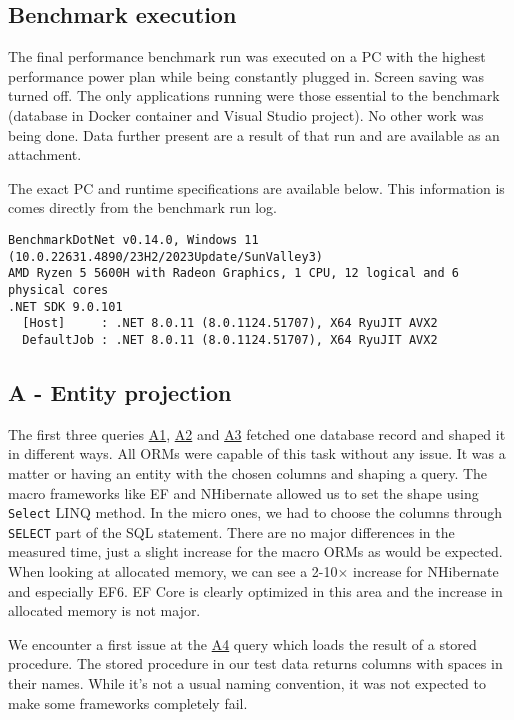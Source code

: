 \subsection{Benchmark execution}
The final performance benchmark run was executed on a PC with the highest performance power plan while being constantly plugged in. Screen saving was turned off. The only applications running were those essential to the benchmark (database in Docker container and Visual Studio project). No other work was being done. Data further present are a result of that run and are available as an attachment.

The exact PC and runtime specifications are available below. This information is comes directly from the benchmark run log. 
\begin{lstlisting}
BenchmarkDotNet v0.14.0, Windows 11 (10.0.22631.4890/23H2/2023Update/SunValley3)
AMD Ryzen 5 5600H with Radeon Graphics, 1 CPU, 12 logical and 6 physical cores
.NET SDK 9.0.101
  [Host]     : .NET 8.0.11 (8.0.1124.51707), X64 RyuJIT AVX2
  DefaultJob : .NET 8.0.11 (8.0.1124.51707), X64 RyuJIT AVX2
\end{lstlisting}

\subsection{A - Entity projection}
The first three queries \hyperref[query:a1]{A1}, \hyperref[query:a2]{A2} and \hyperref[query:a3]{A3} fetched one database record and shaped it in different ways. All ORMs were capable of this task without any issue. It was a matter or having an entity with the chosen columns and shaping a query. The macro frameworks like EF and NHibernate allowed us to set the shape using \texttt{Select} LINQ method. In the micro ones, we had to choose the columns through \texttt{SELECT} part of the SQL statement. 
There are no major differences in the measured time, just a slight increase for the macro ORMs as would be expected. When looking at allocated memory, we can see a 2-10$\times$ increase for NHibernate  and especially EF6. EF Core is clearly optimized in this area and the increase in allocated memory is not major. 

We encounter a first issue at the \hyperref[query:a4]{A4} query which loads the result of a stored procedure. The stored procedure in our test data returns columns with spaces in their names. While it's not a usual naming convention, it was not expected to make some frameworks completely fail.

